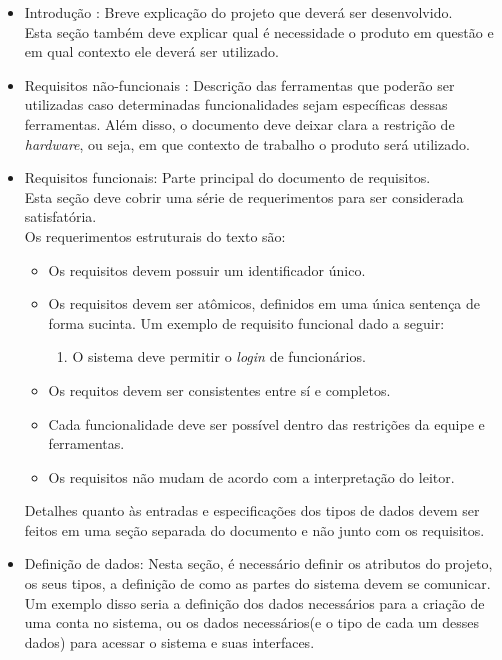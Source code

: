 \documentclass[12pt,a4paper,final]{report}
\begin{document}
\begin{itemize}
\item Introdução : Breve explicação do projeto que deverá ser desenvolvido.\\ Esta seção também deve explicar qual é necessidade o produto em questão e em qual contexto ele deverá ser utilizado.

\item Requisitos não-funcionais : Descrição das ferramentas que poderão ser utilizadas caso determinadas funcionalidades sejam específicas dessas ferramentas. Além disso, o documento deve deixar clara a restrição de \textit{hardware}, ou seja, em que contexto de trabalho o produto será utilizado.

\item Requisitos funcionais: Parte principal do documento de requisitos.\\
Esta seção deve cobrir uma série de requerimentos para ser considerada satisfatória.\\
Os requerimentos estruturais do texto são:

\begin{itemize}
\item Os requisitos devem possuir um identificador único.

\item Os requisitos devem ser atômicos,
definidos em uma única sentença de forma sucinta.
Um exemplo de requisito funcional dado a seguir:
\begin{enumerate}
\item O sistema deve permitir o \textit{login} de funcionários.
\end{enumerate}

\item Os requitos devem ser consistentes entre sí e completos.

\item Cada funcionalidade deve ser possível dentro das restrições da equipe e ferramentas.

\item Os requisitos não mudam de acordo com a interpretação do leitor.

\end{itemize}

Detalhes quanto às entradas e especificações dos tipos de dados devem ser feitos em uma seção separada do documento e não junto com os requisitos.\\

\item Definição de dados:
Nesta seção, é necessário definir os atributos do projeto, os seus tipos, a definição de como as partes do sistema devem se comunicar.\\
Um exemplo disso seria a definição dos dados necessários para a criação de uma conta no sistema, ou os dados necessários(e o tipo de cada um desses dados) para acessar o sistema e suas interfaces.


\end{itemize}
\end{document}
